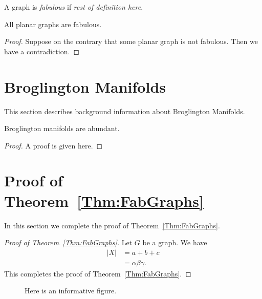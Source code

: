 \documentclass[12pt]{article}
\begin{document}
\begin{definition} 
  A graph is \emph{fabulous} if \emph{rest of definition here}.
\end{definition}

\begin{theorem}\label{Thm:FabGraphs}
  All planar graphs are fabulous.
\end{theorem}

\begin{proof}
  Suppose on the contrary that some planar graph is not fabulous.
  Then we have a contradiction.
\end{proof}

\section{Broglington Manifolds}

This section describes background information about Broglington
Manifolds.

\begin{lemma}\label{lem:Technical}
  Broglington manifolds are abundant.
\end{lemma}

\begin{proof}
  A proof is given here.
\end{proof}

\section{Proof of Theorem~\ref{Thm:FabGraphs}}

In this section we complete the proof of Theorem~\ref{Thm:FabGraphs}.

\begin{proof}[Proof of Theorem~\ref{Thm:FabGraphs}]
Let $G$ be a graph. We have
  \begin{align}
    |X| &= a+b+c \nonumber\\
         &= \alpha\beta\gamma.
  \end{align}
  This completes the proof of Theorem~\ref{Thm:FabGraphs}.
\end{proof}

\begin{figure}[ht]
  \centering
  \caption{Here is an informative figure.\label{fig:InformativeFigure}}
\end{figure}
\end{document}
